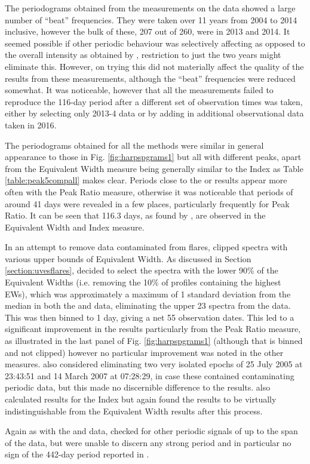 The periodograms obtained from the {\ha} measurements on the {\harps} data showed a large number of ``beat''
frequencies. They were taken over 11 years from 2004 to 2014 inclusive, however the bulk of these, 207 out of 260, were
in 2013 and 2014. It seemed possible if other periodic behaviour was selectively affecting {\ha} as opposed to the
overall intensity as obtained by \asas, restriction to just the two years might eliminate this. However, on trying this
did not materially affect the quality of the results from these measurements, although the ``beat'' frequencies were
reduced somewhat. It was noticeable, however that all the measurements failed to reproduce the 116-day period after a
different set of observation times was taken, either by selecting only 2013-4 data or by adding in additional
observational data taken in 2016.

The periodograms obtained for all the methods were similar in general appearance to those in Fig. \ref{fig:harpspgrams1}
but all with different peaks, apart from the Equivalent Width measure being generally similar to the {\ha} Index as
Table \ref{table:peak5compall} makes clear. Periods close to the {\asas} or {\hst} results appear more often with the
Peak Ratio measure, otherwise it was noticeable that periods of around 41 days were revealed in a few places,
particularly frequently for Peak Ratio. It can be seen that 116.3 days, as found by \citet{suarezmascareno15}, are
observed in the Equivalent Width and {\ha} Index measure.

In an attempt to remove data contaminated from flares, {\Firstp} clipped spectra with various upper bounds of Equivalent
Width. As discussed in Section \ref{section:uvesflares}, {\Firstp} decided to select the spectra with the lower 90\% of
the Equivalent Widths (i.e. removing the 10\% of profiles containing the highest EWs), which was approximately a maximum
of 1 standard deviation from the median in both the {\harps} and {\uves} data, eliminating the upper 23 spectra from the
{\harps} data. This was then binned to 1 day, giving a net 55 observation dates. This led to a significant improvement
in the results particularly from the Peak Ratio measure, as illustrated in the last panel of Fig. \ref{fig:harpspgrams1}
(although that is binned and not clipped) however no particular improvement was noted in the other measures.  {\FirstP}
also considered eliminating two very isolated epochs of 25 July 2005 at 23:43:51 and 14 March 2007 at 07:28:29, in case
these contained contaminating periodic data, but this made no discernible difference to the results. {\FirstP} also
calculated results for the {\ha} Index but again found the results to be virtually indistinguishable from the Equivalent
Width results after this process.

Again as with the {\asas} and {\hst} data, {\Firstp} checked for other periodic signals of up to the span of the data,
but were unable to discern any strong period and in particular no sign of the 442-day period reported in
\citet{cincunegui07}.
